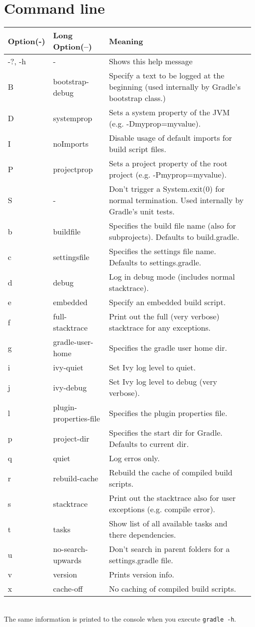 \chapter{Command line} %
\label{cha:command_line}

\begin{tabular}{l|l|l}
\textbf{Option}(-) & \textbf{Long Option}(--) & \textbf{Meaning}\\ \hline
-?, -h  & -           & Shows this help message\\
B & bootstrap-debug & Specify a text to be logged at the beginning (used internally by Gradle's bootstrap class.)\\
D & systemprop       & Sets a system property of the JVM (e.g. -Dmyprop=myvalue).\\ 
I & noImports        & Disable usage of default imports for build script files.\\
P & projectprop  & Sets a project property of the root project (e.g. -Pmyprop=myvalue).\\
S & - & Don't trigger a System.exit(0) for normal termination. Used internally by Gradle's unit tests.\\
b & buildfile        & Specifies the build file name (also for subprojects). Defaults to build.gradle.\\
c & settingsfile     & Specifies the settings file name. Defaults to settings.gradle.\\
d & debug            & Log in debug mode (includes normal stacktrace).\\
e & embedded         & Specify an embedded build script.\\
f & full-stacktrace  & Print out the full (very verbose) stacktrace for any exceptions.\\
g & gradle-user-home & Specifies the gradle user home dir.\\
i & ivy-quiet        & Set Ivy log level to quiet.\\
j & ivy-debug        & Set Ivy log level to debug (very verbose).\\
l & plugin-properties-file & Specifies the plugin properties file.\\
p & project-dir       & Specifies the start dir for Gradle. Defaults to current dir.\\
q & quiet            & Log erros only.\\
r & rebuild-cache    & Rebuild the cache of compiled build scripts.\\
s & stacktrace       & Print out the stacktrace also for user exceptions (e.g. compile error).\\
t & tasks            & Show list of all available tasks and there dependencies.\\
u & no-search-upwards  & Don't search in parent folders for a settings.gradle file.\\
v & version          & Prints version info.\\
x & cache-off        & No caching of compiled build scripts.\\

\end{tabular}
\\
 
\noindent The same information is printed to the console when you execute \texttt{gradle -h}.\\
